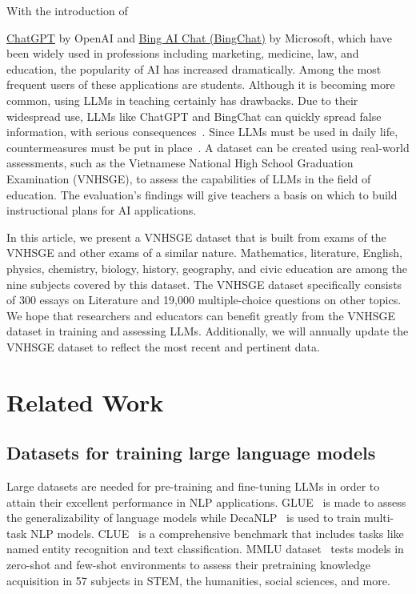 \documentclass{article}
\begin{document}
	With the introduction of {\href{https://chat.openai.com/}{ChatGPT} by OpenAI and \href{https://bing.com/chat}{Bing AI Chat (BingChat)} by Microsoft, which have been widely used in professions including marketing, medicine, law, and education, the popularity of AI has increased dramatically. Among the most frequent users of these applications are students. Although it is becoming more common, using LLMs in teaching certainly has drawbacks. Due to their widespread use, LLMs like ChatGPT and BingChat can quickly spread false information, with serious consequences~\cite{thorp2023chatgpt}. Since LLMs must be used in daily life, countermeasures must be put in place~\cite{van2023chatgpt}. A dataset can be created using real-world assessments, such as the Vietnamese National High School Graduation Examination (VNHSGE), to assess the capabilities of LLMs in the field of education. The evaluation's findings will give teachers a basis on which to build instructional plans for AI applications.
		
		In this article, we present a VNHSGE dataset that is built from exams of the VNHSGE and other exams of a similar nature. Mathematics, literature, English, physics, chemistry, biology, history, geography, and civic education are among the nine subjects covered by this dataset. The VNHSGE dataset specifically consists of 300 essays on Literature and 19,000 multiple-choice questions on other topics. We hope that researchers and educators can benefit greatly from the VNHSGE dataset in training and assessing LLMs. Additionally, we will annually update the VNHSGE dataset to reflect the most recent and pertinent data.
	
	\section{Related Work}
	\label{sec:related_work}
	
	\subsection{Datasets for training large language models}
	
	Large datasets are needed for pre-training and fine-tuning LLMs in order to attain their excellent performance in NLP applications. GLUE~\cite{wang2018glue} is made to assess the generalizability of language models while DecaNLP~\cite{mccann2018natural} is used to train multi-task NLP models. CLUE~\cite{xu2020clue} is a comprehensive benchmark that includes tasks like named entity recognition and text classification. MMLU dataset~\cite{hendrycks2020measuring} tests models in zero-shot and few-shot environments to assess their pretraining knowledge acquisition in 57 subjects in STEM, the humanities, social sciences, and more. 
	
}
\end{document}
